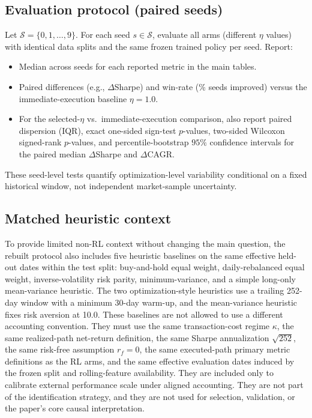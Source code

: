 \documentclass[10pt,twocolumn]{article}
\newcommand{\kappaTC}{\kappa}
\begin{document}
\subsection{Evaluation protocol (paired seeds)}
Let $\mathcal{S}=\{0,1,\dots,9\}$. For each seed $s\in\mathcal{S}$, evaluate all arms (different $\eta$ values) with identical data splits and the same frozen trained policy per seed.
Report:
\begin{itemize}[leftmargin=*,itemsep=1pt]
\item Median across seeds for each reported metric in the main tables.
\item Paired differences (e.g., $\Delta$Sharpe) and win-rate (\% seeds improved) versus the immediate-execution baseline $\eta=1.0$.
\item For the selected-$\eta$ vs.\ immediate-execution comparison, also report paired dispersion (IQR), exact one-sided sign-test $p$-values, two-sided Wilcoxon signed-rank $p$-values, and percentile-bootstrap $95\%$ confidence intervals for the paired median $\Delta$Sharpe and $\Delta$CAGR.
\end{itemize}
These seed-level tests quantify optimization-level variability conditional on a fixed historical window, not independent market-sample uncertainty.

\subsection{Matched heuristic context}
To provide limited non-RL context without changing the main question, the rebuilt protocol also includes five heuristic baselines on the same effective held-out dates within the test split: buy-and-hold equal weight, daily-rebalanced equal weight, inverse-volatility risk parity, minimum-variance, and a simple long-only mean-variance heuristic. The two optimization-style heuristics use a trailing 252-day window with a minimum 30-day warm-up, and the mean-variance heuristic fixes risk aversion at 10.0. These baselines are not allowed to use a different accounting convention. They must use the same transaction-cost regime $\kappaTC$, the same realized-path net-return definition, the same Sharpe annualization $\sqrt{252}$, the same risk-free assumption $r_f=0$, the same executed-path primary metric definitions as the RL arms, and the same effective evaluation dates induced by the frozen split and rolling-feature availability. They are included only to calibrate external performance scale under aligned accounting. They are not part of the identification strategy, and they are not used for selection, validation, or the paper's core causal interpretation.
\end{document}
